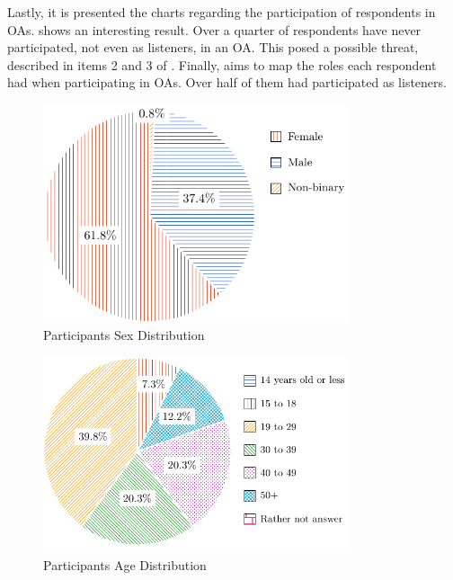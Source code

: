 Lastly, it is presented the charts regarding the participation of respondents in \acp{OA}.  shows an interesting result. Over a quarter of respondents have never participated, not even as listeners, in an \ac{OA}. This posed a possible threat, described in items 2 and 3 of . Finally,  aims to map the roles each respondent had when participating in \acp{OA}. Over half of them had participated as listeners.

\begin{figure}[!htb]
  \caption{Participants Sex Distribution}\label{fig:sex-distribution}
  \begin{center}
    \includegraphics[width=9cm]{img/5-participants-sex.pdf}
  \end{center}
\end{figure}

\begin{figure}[!htb]
  \caption{Participants Age Distribution}\label{fig:age-distribution}
  \begin{center}
    \includegraphics[width=9cm]{img/5-participants-age.pdf}
  \end{center}
\end{figure}

